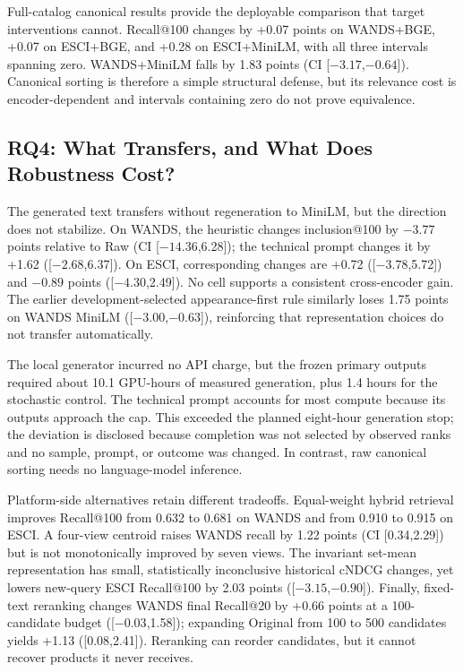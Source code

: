 Full-catalog canonical results provide the deployable comparison that target interventions cannot. Recall@100 changes by +0.07 points on WANDS+BGE, +0.07 on ESCI+BGE, and +0.28 on ESCI+MiniLM, with all three intervals spanning zero. WANDS+MiniLM falls by 1.83 points (CI [$-3.17$,$-0.64$]). Canonical sorting is therefore a simple structural defense, but its relevance cost is encoder-dependent and intervals containing zero do not prove equivalence.

\subsection{RQ4: What Transfers, and What Does Robustness Cost?}
The generated text transfers without regeneration to MiniLM, but the direction does not stabilize. On WANDS, the heuristic changes inclusion@100 by $-3.77$ points relative to Raw (CI [$-14.36$,6.28]); the technical prompt changes it by +1.62 ([$-2.68$,6.37]). On ESCI, corresponding changes are +0.72 ([$-3.78$,5.72]) and $-0.89$ points ([$-4.30$,2.49]). No cell supports a consistent cross-encoder gain. The earlier development-selected appearance-first rule similarly loses 1.75 points on WANDS MiniLM ([$-3.00$,$-0.63$]), reinforcing that representation choices do not transfer automatically.

The local generator incurred no API charge, but the frozen primary outputs required about 10.1 GPU-hours of measured generation, plus 1.4 hours for the stochastic control. The technical prompt accounts for most compute because its outputs approach the cap. This exceeded the planned eight-hour generation stop; the deviation is disclosed because completion was not selected by observed ranks and no sample, prompt, or outcome was changed. In contrast, raw canonical sorting needs no language-model inference.

Platform-side alternatives retain different tradeoffs. Equal-weight hybrid retrieval improves Recall@100 from 0.632 to 0.681 on WANDS and from 0.910 to 0.915 on ESCI. A four-view centroid raises WANDS recall by 1.22 points (CI [0.34,2.29]) but is not monotonically improved by seven views. The invariant set-mean representation has small, statistically inconclusive historical cNDCG changes, yet lowers new-query ESCI Recall@100 by 2.03 points ([$-3.15$,$-0.90$]). Finally, fixed-text reranking changes WANDS final Recall@20 by +0.66 points at a 100-candidate budget ([$-0.03$,1.58]); expanding Original from 100 to 500 candidates yields +1.13 ([$0.08$,2.41]). Reranking can reorder candidates, but it cannot recover products it never receives.
